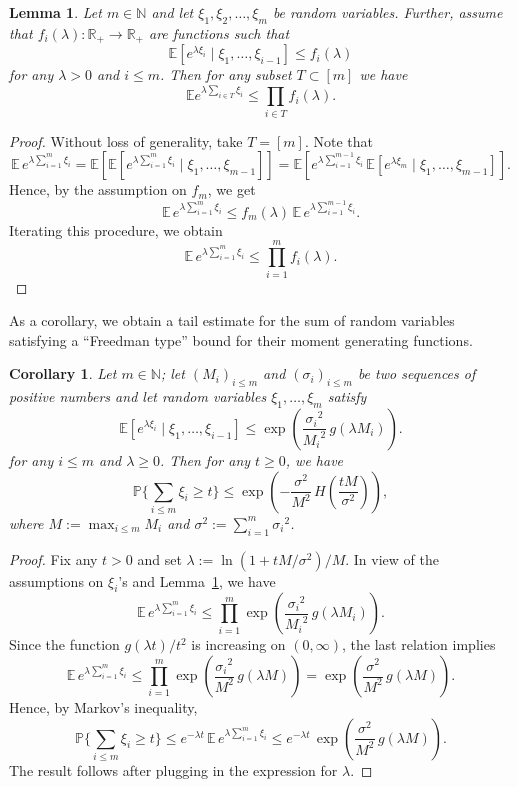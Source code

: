 \documentclass[12pt]{article}
\newtheorem{lemma}[theorem]{Lemma}
\newtheorem{cor}[theorem]{Corollary}
\theoremstyle{definition}
\theoremstyle{plain}
\newcommand{\N}{\mathbb{N}}
\newcommand{\E}{\mathbb{E}}
\newcommand{\R}{\mathbb{R}}
\def\Prob{{\mathbb P}}
\def\gfunction{{g}}
\begin{document}
\begin{lemma}\label{lem-freedman-tensorization}
Let $m\in\N$ and let $\xi_1,\xi_2,\ldots,\xi_m$ be random variables.
Further, assume that $f_i(\lambda):\R_+\to\R_+$ are functions such that
$$\E [e^{\lambda \xi_i}\mid \xi_1,\ldots,\xi_{i-1}]\leq f_i(\lambda)$$
for any $\lambda>0$ and $i\leq m$. Then for any subset $T\subset[m]$ we have
$$\E e^{\lambda \sum_{i\in T}\xi_i}\leq \prod_{i\in T}f_i(\lambda).$$
\end{lemma}
\begin{proof}
Without loss of generality, take $T=[m]$.
Note that 
$$
\E\, e^{\lambda \sum_{i=1}^m\xi_i} = 
\E\left[ \E [e^{\lambda \sum_{i=1}^m\xi_i} \mid \xi_1,\ldots,\xi_{m-1}]\right]
=\E \left[ e^{\lambda\sum_{i=1}^{m-1} \xi_i}\,  \E [e^{\lambda \xi_m}\mid \xi_1,\ldots,\xi_{m-1}]\right].
$$
Hence, by the assumption on $f_m$, we get
$$
\E\, e^{\lambda \sum_{i=1}^m\xi_i}
\leq f_m(\lambda)\,  \E\, e^{\lambda\sum_{i=1}^{m-1} \xi_i}.
$$
Iterating this procedure, we obtain
$$
\E\, e^{\lambda \sum_{i=1}^m\xi_i}\leq \prod_{i=1}^m f_i(\lambda).
$$
\end{proof}

As a corollary, we obtain a tail estimate for the sum of random variables satisfying a ``Freedman type''
bound for their moment generating functions. 

\begin{cor}\label{cor-freedman-tensorization}
Let $m\in\N$; let $(M_i)_{i\leq m}$ and $(\sigma_i)_{i\leq m}$ be two sequences of positive numbers
and let random variables $\xi_1,\ldots,\xi_m$ satisfy
\begin{equation*}
\E [e^{\lambda \xi_i}\mid \xi_1,\ldots,\xi_{i-1}]\leq \exp\left(\frac{{\sigma_i}^2}{{M_i}^2}\,\gfunction(\lambda M_i)\right).
\end{equation*}
for any $i\leq m$ and $\lambda\geq 0$. Then for any $t\geq 0$, we have 
$$
\Prob\Big\{\sum_{i\leq m}\xi_i\geq t\Big\}\leq  \exp\left(-\frac{\sigma^2}{M^2}\, H\left(\frac{tM}{\sigma^2}\right)\right),
$$
where $M:=\max_{i\leq m} M_i$ and $\sigma^2:=\sum_{i=1}^m {\sigma_i}^2$.
\end{cor}
\begin{proof}
Fix any $t>0$ and set $\lambda:=\ln(1+tM/\sigma^2)/M$.
In view of the assumptions on $\xi_i$'s and Lemma~\ref{lem-freedman-tensorization},
we have
$$\E\, e^{\lambda \sum_{i=1}^m\xi_i}\leq \prod_{i=1}^m\exp\left( \frac{{\sigma_i}^2}{{M_i}^2}\,\gfunction(\lambda M_i)\right).$$
Since the function $\gfunction(\lambda t)/t^2$ is increasing on $(0,\infty)$, the last relation implies
$$
\E\, e^{\lambda \sum_{i=1}^m\xi_i}\leq \prod_{i=1}^m\exp\left( \frac{{\sigma_i}^2}{M^2}\,\gfunction(\lambda M)\right)
=\exp\left(\frac{\sigma^2}{M^2}\,\gfunction(\lambda M)\right).
$$
Hence, by Markov's inequality,
$$
\Prob\Big\{ \sum_{i\leq m}\xi_i \geq t\Big\}\leq
e^{-\lambda t}\, \E\, e^{\lambda \sum_{i=1}^m\xi_i}
\leq e^{-\lambda t}\, \exp\left( \frac{\sigma^2}{M^2}\,\gfunction(\lambda M)\right).
$$
The result follows after plugging in the expression for $\lambda$.
\end{proof}
\end{document}
